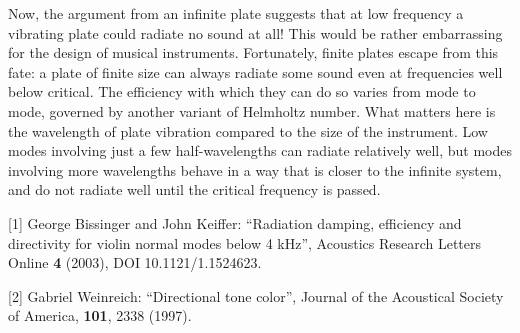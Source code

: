   Now, the argument from an infinite plate suggests that at low frequency a 
  vibrating plate could radiate no sound at all! This would be rather 
  embarrassing for the design of musical instruments. Fortunately, finite 
  plates escape from this fate: a plate of finite size can always radiate some 
  sound even at frequencies well below critical. The efficiency with which they 
  can do so varies from mode to mode, governed by another variant of Helmholtz 
  number. What matters here is the wavelength of plate vibration compared to 
  the size of the instrument. Low modes involving just a few half-wavelengths 
  can radiate relatively well, but modes involving more wavelengths behave in a 
  way that is closer to the infinite system, and do not radiate well until the 
  critical frequency is passed. 



  \sectionreferences{}[1] George Bissinger and John Keiffer: ``Radiation 
  damping, efficiency and directivity for violin normal modes below 4 kHz'', 
  Acoustics Research Letters Online \textbf{4} (2003), DOI 10.1121/1.1524623. 

  [2] Gabriel Weinreich: ``Directional tone color'', Journal of the Acoustical 
  Society of America, \textbf{101}, 2338 (1997). 